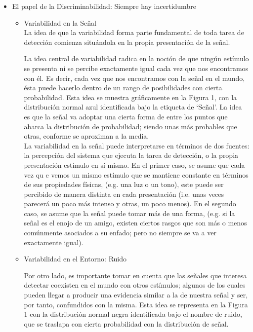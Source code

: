 \begin{itemize}
  \item{El papel de la Discriminabilidad: Siempre hay incertidumbre}



    \begin{itemize}
      \item{Variabilidad en la Señal}\\

%

La idea de que la variabilidad forma parte fundamental de toda tarea de detección comienza situándola en la propia presentación de la señal. 

La idea central de variabilidad radica en la noción de que ningún estímulo se presenta ni se percibe exactamente igual cada vez que nos encontramos con él.  Es decir, cada vez que nos encontramos con la  señal en el mundo, ésta puede hacerlo dentro de un rango de posibilidades con cierta probabilidad. Esta idea se muestra gráficamente en la Figura 1, con la distribución normal azul identificada bajo la etiqueta de ‘Señal’. La idea es que la señal va adoptar una cierta forma de entre los puntos que abarca la distribución de probabilidad; siendo unas más probables que otras, conforme se aproximan a la media.\\

La variabilidad en la señal puede interpretarse en términos de dos fuentes: la percepción del sistema que ejecuta la tarea de detección, o la propia presentación estímulo en sí mismo. En el primer caso, se asume que cada vez qu e vemos un mismo estímulo que se mantiene constante en términos de sus propiedades físicas,  (e.g. una luz o un tono),  este puede ser percibido de manera distinta en cada presentación (i.e. unas veces parecerá un poco más intenso y otras, un poco menos). En el segundo caso, se asume que la señal puede tomar más de una forma, (e.g. si la señal es el enojo de un amigo, existen ciertos rasgos que son más o menos comúnmente asociados a su enfado; pero no siempre se va a ver exactamente igual).\\

      \item{Variabilidad en el Entorno: Ruido}

Por otro lado, es importante tomar en cuenta que las señales que interesa detectar coexisten en el mundo con otros estímulos; algunos de los cuales pueden llegar a producir una evidencia similar a la de nuestra señal y ser, por tanto, confundidos con la misma. Esta idea se representa en la Figura 1 con la distribución normal negra identificada bajo el nombre de ruido, que se traslapa con cierta probabilidad con la distribución de señal.\\



\end{itemize}
\end{itemize}
